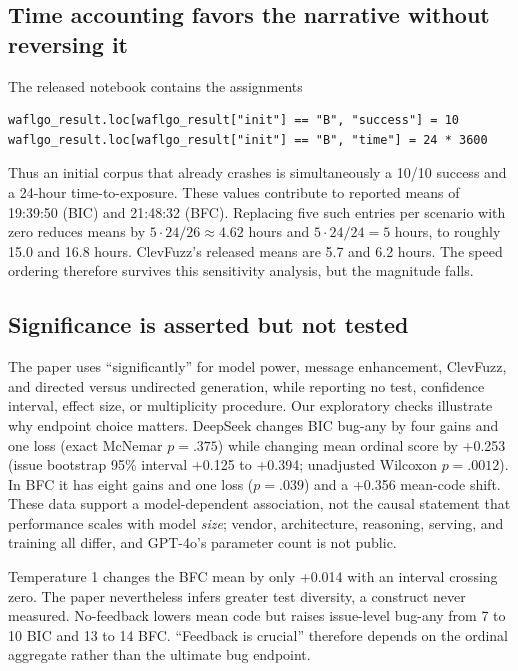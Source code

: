 \documentclass{article}
\begin{document}
\subsection{Time accounting favors the narrative without reversing it}

The released notebook contains the assignments
\begin{lstlisting}[style=auditcode,numbers=none]
waflgo_result.loc[waflgo_result["init"] == "B", "success"] = 10
waflgo_result.loc[waflgo_result["init"] == "B", "time"] = 24 * 3600
\end{lstlisting}
Thus an initial corpus that already crashes is simultaneously a 10/10 success
and a 24-hour time-to-exposure.  These values contribute to reported means of
19:39:50 (BIC) and 21:48:32 (BFC).  Replacing five such entries per scenario
with zero reduces means by $5\cdot24/26\approx4.62$ hours and
$5\cdot24/24=5$ hours, to roughly 15.0 and 16.8 hours.  ClevFuzz's released
means are 5.7 and 6.2 hours.  The speed ordering therefore survives this
sensitivity analysis, but the magnitude falls.

\subsection{Significance is asserted but not tested}

The paper uses ``significantly'' for model power, message enhancement,
ClevFuzz, and directed versus undirected generation, while reporting no test,
confidence interval, effect size, or multiplicity procedure.  Our exploratory
checks illustrate why endpoint choice matters.  DeepSeek changes BIC bug-any
by four gains and one loss (exact McNemar $p=.375$) while changing mean ordinal
score by +0.253 (issue bootstrap 95\% interval +0.125 to +0.394; unadjusted
Wilcoxon $p=.0012$).  In BFC it has eight gains and one loss
($p=.039$) and a +0.356 mean-code shift.  These data support a model-dependent
association, not the causal statement that performance scales with model
\emph{size}; vendor, architecture, reasoning, serving, and training all differ,
and GPT-4o's parameter count is not public.

Temperature 1 changes the BFC mean by only +0.014 with an interval crossing
zero.  The paper nevertheless infers greater test diversity, a construct never
measured.  No-feedback lowers mean code but raises issue-level bug-any from
7 to 10 BIC and 13 to 14 BFC.  ``Feedback is crucial'' therefore depends on the
ordinal aggregate rather than the ultimate bug endpoint.
\end{document}
